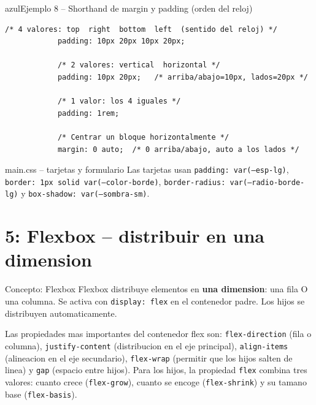 \documentclass[11pt,a4paper]{article}
\begin{document}
	\begin{cajacodigo}{azul}{Ejemplo 8 -- Shorthand de margin y padding (orden del reloj)}
		\begin{lstlisting}[style=codecss]
			/* 4 valores: top  right  bottom  left  (sentido del reloj) */
			padding: 10px 20px 10px 20px;
			
			/* 2 valores: vertical  horizontal */
			padding: 10px 20px;   /* arriba/abajo=10px, lados=20px */
			
			/* 1 valor: los 4 iguales */
			padding: 1rem;
			
			/* Centrar un bloque horizontalmente */
			margin: 0 auto;  /* 0 arriba/abajo, auto a los lados */
		\end{lstlisting}
	\end{cajacodigo}
	
	\begin{cajapractica}{main.css -- tarjetas y formulario}
		Las tarjetas usan \texttt{padding: var(--esp-lg)}, \texttt{border: 1px solid var(--color-borde)}, \texttt{border-radius: var(--radio-borde-lg)} y \texttt{box-shadow: var(--sombra-sm)}.
	\end{cajapractica}
	
	\section{5: Flexbox -- distribuir en una dimension}
	
	\begin{cajaconcepto}{Concepto: Flexbox}
		Flexbox distribuye elementos en \textbf{una dimension}: una fila O una columna. Se activa con \texttt{display: flex} en el contenedor padre. Los hijos se distribuyen automaticamente.
		
		Las propiedades mas importantes del contenedor flex son: \texttt{flex-direction} (fila o columna), \texttt{justify-content} (distribucion en el eje principal), \texttt{align-items} (alineacion en el eje secundario), \texttt{flex-wrap} (permitir que los hijos salten de linea) y \texttt{gap} (espacio entre hijos). Para los hijos, la propiedad \texttt{flex} combina tres valores: cuanto crece (\texttt{flex-grow}), cuanto se encoge (\texttt{flex-shrink}) y su tamano base (\texttt{flex-basis}).
	\end{cajaconcepto}
	
\end{document}
